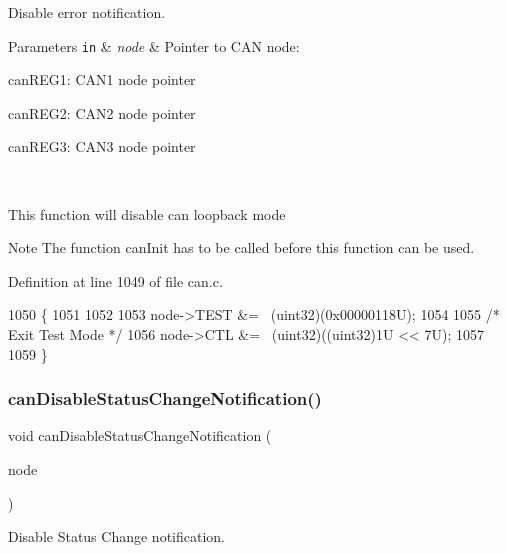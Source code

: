 Disable error notification. 


\begin{DoxyParams}[1]{Parameters}
\mbox{\tt in}  & {\em node} & Pointer to C\+AN node\+:
\begin{DoxyItemize}
\item can\+R\+E\+G1\+: C\+A\+N1 node pointer
\item can\+R\+E\+G2\+: C\+A\+N2 node pointer
\item can\+R\+E\+G3\+: C\+A\+N3 node pointer
\end{DoxyItemize}\\
\hline
\end{DoxyParams}
This function will disable can loopback mode \begin{DoxyNote}{Note}
The function can\+Init has to be called before this function can be used. 
\end{DoxyNote}


Definition at line 1049 of file can.\+c.


\begin{DoxyCode}
1050 \{
1051 
1052    
1053     node->TEST &= ~(uint32)(0x00000118U);
1054     
1055     \textcolor{comment}{/* Exit Test Mode */}
1056     node->CTL &= ~(uint32)((uint32)1U << 7U);
1057     
1059 \}
\end{DoxyCode}
\mbox{\label{group__CAN_ga7d16cc0c633d487a0c6ba6dd0d6aa15a}} 
\subsubsection{\texorpdfstring{can\+Disable\+Status\+Change\+Notification()}{canDisableStatusChangeNotification()}}
{\footnotesize\ttfamily void can\+Disable\+Status\+Change\+Notification (\begin{DoxyParamCaption}\item[{\mbox{\hyperlink{reg__can_8h_a54ace0879c28a425474845a63d662c05}{can\+B\+A\+S\+E\+\_\+t}} $\ast$}]{node }\end{DoxyParamCaption})}



Disable Status Change notification. 


